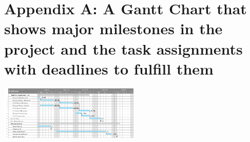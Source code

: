 \documentclass[11pt,conference,onecolumn]{article} %
\begin{document}
\pagebreak

\vspace*{\fill}
\section*{Appendix A: A Gantt Chart that shows major milestones in the project and the task assignments with deadlines to fulfill them} 
\vspace*{\fill}
\clearpage
\hspace*{\fill}
  \includegraphics[angle=90,origin=c,width=0.5\textwidth]{images/GanttChart.PNG}
\hspace*{\fill}
\end{document}
